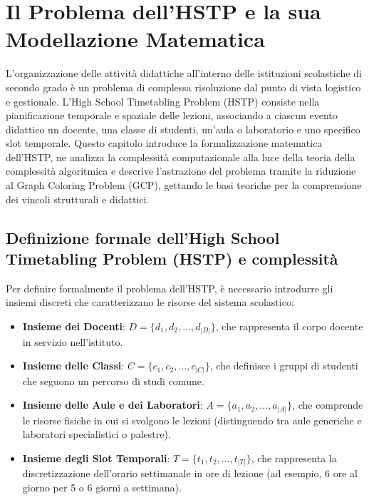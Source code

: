 \chapter{Il Problema dell'HSTP e la sua Modellazione Matematica}
\label{chap:capitolo1}

L'organizzazione delle attività didattiche all'interno delle istituzioni
scolastiche di secondo grado è un problema di complessa risoluzione dal punto di
vista logistico e gestionale. L'High School Timetabling Problem (HSTP)
\cite{colorni1998metaheuristics} consiste nella pianificazione temporale e
spaziale delle lezioni, associando a ciascun evento didattico un docente, una
classe di studenti, un'aula o laboratorio e uno specifico slot temporale. Questo
capitolo introduce la formalizzazione matematica dell'HSTP, ne analizza la
complessità computazionale alla luce della teoria della complessità algoritmica
e descrive l'astrazione del problema tramite la riduzione al Graph Coloring
Problem (GCP), gettando le basi teoriche per la comprensione dei vincoli
strutturali e didattici.
\newpage

\section{Definizione formale dell'High School Timetabling Problem (HSTP) e complessità}
\label{sec:definizione-formalizzazione-hstp}

Per definire formalmente il problema dell'HSTP, è necessario introdurre gli
insiemi discreti che caratterizzano le risorse del sistema scolastico:
\begin{itemize}
    \item \textbf{Insieme dei Docenti}: $D = \{d_1, d_2, \dots, d_{|D|}\}$, che
    rappresenta il corpo docente in servizio nell'istituto.
    \item \textbf{Insieme delle Classi}: $C = \{c_1, c_2, \dots, c_{|C|}\}$, che
    definisce i gruppi di studenti che seguono un percorso di studi comune.
    \item \textbf{Insieme delle Aule e dei Laboratori}: $A = \{a_1, a_2, \dots,
    a_{|A|}\}$, che comprende le risorse fisiche in cui si svolgono le lezioni
    (distinguendo tra aule generiche e laboratori specialistici o palestre).
    \item \textbf{Insieme degli Slot Temporali}: $T = \{t_1, t_2, \dots,
    t_{|T|}\}$, che rappresenta la discretizzazione dell'orario settimanale in
    ore di lezione (ad esempio, 6 ore al giorno per 5 o 6 giorni a settimana).
\end{itemize}

